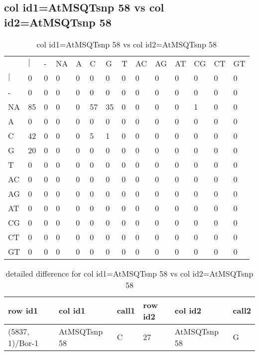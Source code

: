 \subsection{col id1=AtMSQTsnp 58 vs col id2=AtMSQTsnp 58}
\begin{center}
\begin{longtable}{|l|l|l|l|l|l|l|l|l|l|l|l|l|l|}
\caption{col id1=AtMSQTsnp 58 vs col id2=AtMSQTsnp 58} \label{table_dm754}\\
\hline
\\
\hline
&$|$&-&NA&A&C&G&T&AC&AG&AT&CG&CT&GT\\
$|$&0&0&0&0&0&0&0&0&0&0&0&0&0\\
-&0&0&0&0&0&0&0&0&0&0&0&0&0\\
NA&85&0&0&0&57&35&0&0&0&0&1&0&0\\
A&0&0&0&0&0&0&0&0&0&0&0&0&0\\
C&42&0&0&0&5&1&0&0&0&0&0&0&0\\
G&20&0&0&0&0&0&0&0&0&0&0&0&0\\
T&0&0&0&0&0&0&0&0&0&0&0&0&0\\
AC&0&0&0&0&0&0&0&0&0&0&0&0&0\\
AG&0&0&0&0&0&0&0&0&0&0&0&0&0\\
AT&0&0&0&0&0&0&0&0&0&0&0&0&0\\
CG&0&0&0&0&0&0&0&0&0&0&0&0&0\\
CT&0&0&0&0&0&0&0&0&0&0&0&0&0\\
GT&0&0&0&0&0&0&0&0&0&0&0&0&0\\
\hline
\end{longtable}
\end{center}

\begin{center}
\begin{longtable}{|l|l|l|l|l|l|}
\caption{detailed difference for col id1=AtMSQTsnp 58 vs col id2=AtMSQTsnp 58} \label{table_dm755}\\
\hline
row id1&col id1&call1&row id2&col id2&call2\\
\hline
(5837, 1)/Bor-1&AtMSQTsnp 58&C&27&AtMSQTsnp 58&G\\
\hline
\end{longtable}
\end{center}

